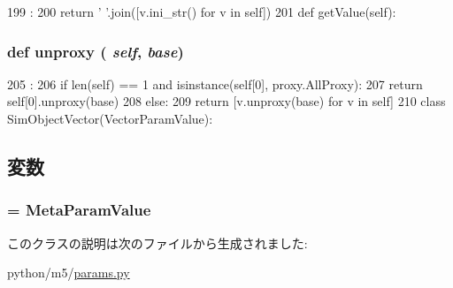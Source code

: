 \begin{DoxyCode}
199                      :
200         return ' '.join([v.ini_str() for v in self])
201 
    def getValue(self):
\end{DoxyCode}
\hypertarget{classm5_1_1params_1_1VectorParamValue_a587cd3c1e899640dc09d63793aa8093b}{
\subsubsection[{unproxy}]{\setlength{\rightskip}{0pt plus 5cm}def unproxy ( {\em self}, \/   {\em base})}}
\label{classm5_1_1params_1_1VectorParamValue_a587cd3c1e899640dc09d63793aa8093b}



\begin{DoxyCode}
205                            :
206         if len(self) == 1 and isinstance(self[0], proxy.AllProxy):
207             return self[0].unproxy(base)
208         else:
209              return [v.unproxy(base) for v in self]
210 
class SimObjectVector(VectorParamValue):
\end{DoxyCode}


\subsection{変数}
\hypertarget{classm5_1_1params_1_1VectorParamValue_adfc4d1824f4ecdcbb04ceafc5bbc933e}{
\subsubsection[{\_\-\_\-metaclass\_\-\_\-}]{ = {\bf MetaParamValue}}}
\label{classm5_1_1params_1_1VectorParamValue_adfc4d1824f4ecdcbb04ceafc5bbc933e}


このクラスの説明は次のファイルから生成されました:\begin{DoxyCompactItemize}
\item 
python/m5/\hyperlink{params_8py}{params.py}\end{DoxyCompactItemize}
